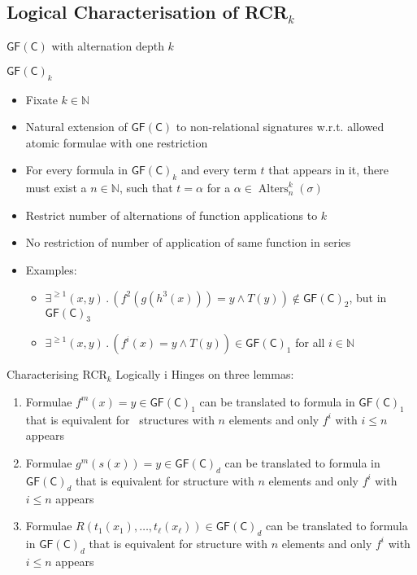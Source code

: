 \documentclass[aspectratio=169]{beamer}
\newcommand{\GFC}{\mathsf{GF}(\mathsf{C})}
\begin{document}
	\subsection{Logical Characterisation of RCR$_k$}
	
	\begin{frame}{$\GFC$ with alternation depth $k$}
		\begin{block}{$\GFC_k$}
			\begin{itemize}
				\item Fixate $k\in\mathbb N$
				\item Natural extension of $\GFC$ to non-relational signatures w.r.t. allowed atomic formulae with one restriction
				\item For every formula in $\GFC_k$ and every term $t$ that appears in it, there must exist a $n\in\mathbb N$, such that $t=\alpha$ for a $\alpha\in\operatorname{Alters}^k_n(\sigma)$
			\end{itemize}
		\end{block}
		\begin{itemize}
			\item Restrict number of alternations of function applications to $k$
			\item No restriction of number of application of same function in series
			\item Examples:
			\begin{itemize}
				\item $\exists^{\geq 1}(x,y) \operatorname{.} (f^2(g(h^3(x)))=y \land T(y))\notin \GFC_2$, but in $\GFC_3$
				\item $\exists^{\geq 1}(x,y) \operatorname{.} (f^i(x)=y \land T(y))\in \GFC_1$ for all $i\in \mathbb N$
			\end{itemize}
		\end{itemize}
	\end{frame}
	
	\begin{frame}{Characterising RCR$_k$ Logically i}
		Hinges on three lemmas:
		\begin{enumerate}
			\item Formulae $f^m(x)=y\in \GFC_1$ can be translated to formula in $\GFC_1$ that is equivalent for ~structures with $n$ elements and only $f^i$ with $i\leq n$ appears
			\item Formulae $g^m(s(x))=y\in \GFC_d$ can be translated to formula in $\GFC_d$ that is equivalent for structure with $n$ elements and only $f^i$ with $i\leq n$ appears
			\item Formulae $R(t_1(x_1),\dots,t_\ell(x_\ell))\in \GFC_d$ can be translated to formula in $\GFC_d$ that is equivalent for structure with $n$ elements and only $f^i$ with $i\leq n$ appears
		\end{enumerate}
	\end{frame}
	
\end{document}
